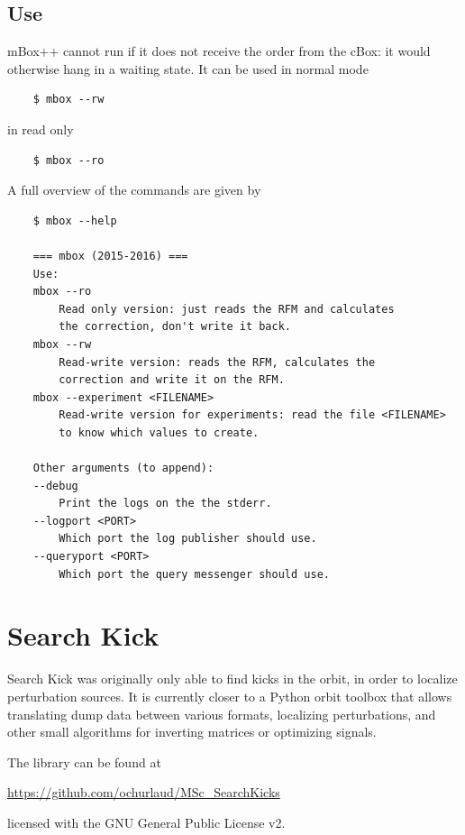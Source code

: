 \section{Use}
mBox++ cannot run if it does not receive the order from the cBox: it would otherwise hang in a waiting state.
It can be used in normal mode
\begin{verbatim}
    $ mbox --rw
\end{verbatim}
in read only
\begin{verbatim}
    $ mbox --ro
\end{verbatim}
A full overview of the commands are given by
\begin{verbatim}
    $ mbox --help

    === mbox (2015-2016) ===
    Use:
    mbox --ro
        Read only version: just reads the RFM and calculates
        the correction, don't write it back.
    mbox --rw
        Read-write version: reads the RFM, calculates the
        correction and write it on the RFM.
    mbox --experiment <FILENAME>
        Read-write version for experiments: read the file <FILENAME>
        to know which values to create.
    
    Other arguments (to append):
    --debug
        Print the logs on the the stderr.
    --logport <PORT>
        Which port the log publisher should use.
    --queryport <PORT>
        Which port the query messenger should use.
\end{verbatim}

\chapter{Search Kick}
Search Kick was originally only able to find kicks in the orbit, in order to localize perturbation sources. It is currently closer to a Python orbit toolbox that allows translating dump data between various formats, localizing perturbations, and other small algorithms for inverting matrices or optimizing signals.

The library can be found at 
\begin{center}
        \url{https://github.com/ochurlaud/MSc_SearchKicks}
\end{center}
licensed with the GNU General Public License v2.


    